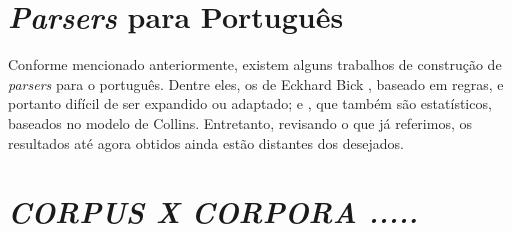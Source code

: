 \section{\emph{Parsers} para Português} %
\label{sec:parsers_para_portugues}

Conforme mencionado anteriormente, existem alguns trabalhos de construção de \emph{parsers} para o português. Dentre eles, os de Eckhard Bick \cite{bick00}, baseado em regras, e portanto difícil de ser expandido ou adaptado; \cite{baldridge06} e \cite{bonfante03}, que também são estatísticos, baseados no modelo de Collins. Entretanto, revisando o que já referimos, os resultados até agora obtidos ainda estão distantes dos desejados.



\section{\emph{CORPUS X CORPORA .....}} %
\label{sec:CORPUSXCORPORA}






